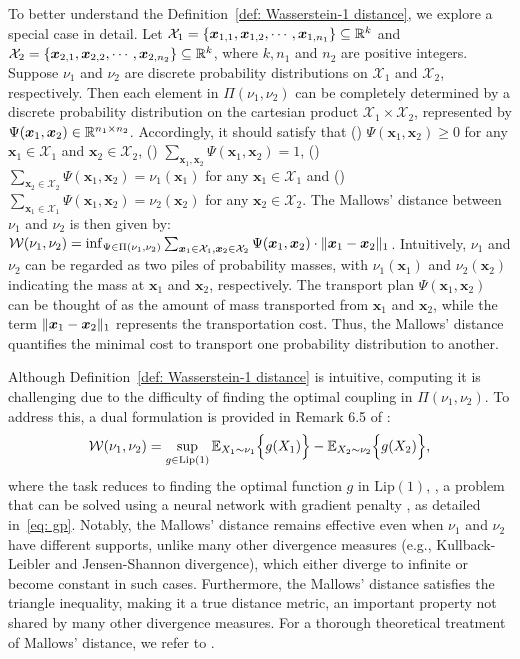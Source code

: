 To better understand the Definition~\ref{def: Wasserstein-1 distance},  we explore a special case in detail. Let $\mathcal{X}_1 = \{\bm{x}_{1,1}, \bm{x}_{1,2}, \cdots, \bm{x}_{1,n_1}\} \subseteq \mathbb{R}^{k}$ and $\mathcal{X}_2 = \{\bm{x}_{2,1},\bm{x}_{2,2},\cdots, \bm{x}_{2,n_2}\} \subseteq \mathbb{R}^{k}$, where $k, n_1$ and $n_2$ are positive integers. Suppose $\nu_1$ and $\nu_2$ are discrete probability distributions on $\mathcal{X}_1$ and $\mathcal{X}_2$, respectively. Then each element in $\Pi(\nu_1, \nu_2)$ can be completely determined by a discrete probability distribution on the cartesian product $\mathcal{X}_1\times \mathcal{X}_2$, represented by $\Psi(\bm{x}_1, \bm{x}_2) \in \mathbb{R}^{n_1 \times n_2}$. Accordingly, it should satisfy that () $\Psi(\bm{x}_1, \bm{x}_2) \geq 0$ for any $\bm{x}_1 \in \mathcal{X}_1$ and $\bm{x}_2 \in \mathcal{X}_2$, () $\sum_{\bm{x}_1,\bm{x}_2}\Psi(\bm{x}_1, \bm{x}_2) = 1$, () $\sum_{\bm{x}_2 \in \mathcal{X}_2}\Psi(\bm{x}_1,\bm{x}_2) = \nu_1(\bm{x}_1)$ for any $\bm{x}_1 \in \mathcal{X}_1$ and () $\sum_{\bm{x}_1 \in \mathcal{X}_1}\Psi(\bm{x}_1,\bm{x}_2) = \nu_2(\bm{x}_2)$ for any $ \bm{x}_2 \in \mathcal{X}_2$. The Mallows' distance between $\nu_1$ and $\nu_2$ is then given by: $\mathcal{W}(\nu_1, \nu_2) = \inf_{\Psi \in \Pi(\nu_1, \nu_2)}\sum_{\bm{x}_1 \in \mathcal{X}_1, \bm{x}_2 \in \mathcal{X}_2}\Psi(\bm{x}_1, \bm{x}_2)\cdot\Vert{\bm{x}_1 - \bm{x}_2}\Vert_1$. Intuitively, $\nu_1$ and $\nu_2$ can be regarded as two piles of probability masses, with $\nu_1(\bm{x}_1)$ and $\nu_2(\bm{x}_2)$  indicating the mass at $\bm{x}_1$ and $\bm{x}_2$, respectively. The transport plan $\Psi(\bm{x}_1, \bm{x}_2)$ can be thought of as the amount of mass transported from $\bm{x}_1$ and $\bm{x}_2$, while the term $\Vert{\bm{x}_1 - \bm{x}_2}\Vert_1$ represents the transportation cost. Thus, the Mallows' distance quantifies the minimal cost to transport one probability distribution to another.

Although Definition~\ref{def: Wasserstein-1 distance} is intuitive, computing it is challenging due to the difficulty of finding the optimal coupling in $\Pi(\nu_1, \nu_2)$. To address this, a dual formulation is provided in Remark 6.5 of \citet{Villani}:
    \begin{align}\label{eq: dual form of wasserstein distance}
        \mathcal{W}(\nu_1, \nu_2) = \sup_{g \in \mathrm{Lip}(1)}\mathbb{E}_{X_1 \sim \nu_1}\Big\{g(X_1)\Big\} - \mathbb{E}_{X_2 \sim \nu_2}\Big\{g(X_2)\Big\},
    \end{align}
where the task reduces to finding the optimal function $g$ in $\mathrm{Lip}(1)$, , a problem that can be solved using a neural network with gradient penalty \citep{gulrajani2017wgangp}, as detailed in~\eqref{eq: gp}. Notably, the Mallows' distance remains effective even when $\nu_1$ and $\nu_2$ have different supports, unlike many other divergence measures (e.g., Kullback-Leibler and Jensen-Shannon divergence), which either diverge to infinite or become constant in such cases.  Furthermore, the Mallows' distance satisfies the triangle inequality, making it a true distance metric, an important property not shared by many other divergence measures. For a thorough theoretical treatment of Mallows' distance, we refer to \citet{Villani}.

